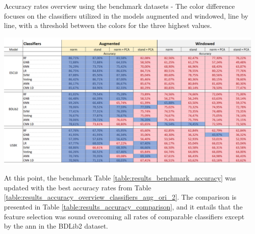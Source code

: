 \begin{table}[ht!]
    \caption[Accuracy rates overview using the benchmark datasets - Models augmented x windowed (Focus on the classifiers line by line)]{Accuracy rates overview using the benchmark datasets - The color difference focuses on the classifiers utilized in the models augmented and windowed, line by line, with a threshold between the colors for the three highest values.}
    \label{table:results_accuracy_overview_features_windowed}
     \raggedright
    \includegraphics[width=1\textwidth]{resources/images/060-results/Results_classification_overview_aug_x_ori_3.png}
\end{table}

At this point, the benchmark Table \ref{table:results_benchmark_accuracy} was updated with the best accuracy rates from Table \ref{table:results_accuracy_overview_classifiers_aug_ori_2}. The comparison is presented in Table \ref{table:results_accuracy_comparison}, and it entails that the feature selection was sound overcoming all rates of comparable classifiers except by the \gls{ann} in the BDLib2 dataset.

